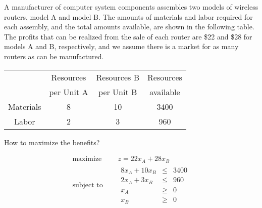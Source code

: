   \begin{Exercise}
    A manufacturer of computer system components assembles two models of wireless routers, model A and model B. The amounts of materials and labor required for each assembly, and the total amounts available, are shown in the following table. The profits that can be realized from the sale of each router are \$22 and \$28 for models A and B, respectively, and we assume there is a market for as many routers as can be manufactured.\cite{carter_operations_2019}
    \begin{center}
    \begin{tabular}{cccc}
      & Resources  & Resources  B & Resources  \\
      & per Unit A &  per Unit B &  available \\\hline
      Materials & 8 & 10 & 3400\\
      Labor & 2 & 3 & 960\\\hline
    \end{tabular}
  \end{center}
  How to maximize the benefits?
  \end{Exercise}
  \begin{equation*}
    \begin{aligned}
      \text{maximize } \quad & z = 22 x_A+28x_B \\
      \text{subject to }\quad &
      \begin{array}{rcl}
        8x_A+10x_B &\leq &3400 \\
        2x_A+3x_B &\leq &960 \\
        x_A &\geq &0 \\
        x_B &\geq& 0
      \end{array}
    \end{aligned}
  \end{equation*}



